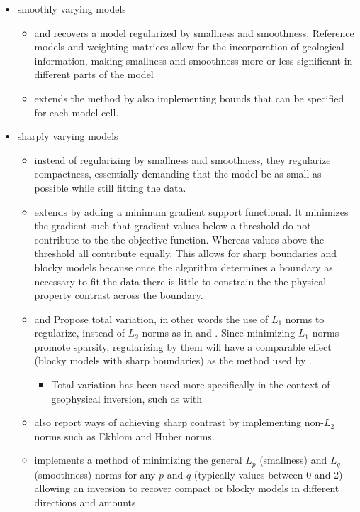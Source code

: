 \begin{itemize}
\item smoothly varying models
\begin{itemize}
\item \cite{li19963} and \cite{li19983}recovers a model regularized by smallness and smoothness. Reference models and weighting matrices allow for the incorporation of geological information, making smallness and smoothness more or less significant in different parts of the model

\item \cite{li2003fast}  extends the method by also implementing bounds that can be specified for each model cell.
\end{itemize}
\item sharply varying models	
\begin{itemize}	
\item \cite{last1983compact} instead of regularizing by smallness and smoothness, they regularize compactness, essentially demanding that the model be as small as possible while still fitting the data. 	
\item \cite{portniaguine1999focusing} extends  \cite{last1983compact} by adding a minimum gradient support functional. It minimizes the gradient such that gradient values below a threshold do not contribute to the the objective function. Whereas values above the threshold all contribute equally. This allows for sharp boundaries and blocky models because once the algorithm determines a boundary as necessary to fit the data there is little to constrain the the physical property contrast across the boundary.
\item \cite{rudin1992nonlinear} and \cite{vogel1998fast} Propose total variation, in other words the use of $L_1$ norms to regularize, instead of $L_2$ norms as in \cite{li19963} and \cite{li19983}. Since minimizing $L_1$ norms promote sparsity, regularizing by them will have a comparable effect (blocky models with sharp boundaries) as the method used by \cite{portniaguine1999focusing}.
	\begin{itemize}
		\item Total variation has been used more specifically in the context of geophysical inversion, such as with \cite{guitton2012blocky}		
	\end{itemize}
\item \cite{farquharson1998non} also report ways of achieving sharp contrast by implementing non-$L_2$ norms such as Ekblom and Huber norms.
\item \cite{fournier2015cooperative} implements a method of minimizing the general $L_p$ (smallness) and $L_q$ (smoothness) norms for any $p$ and $q$ (typically values between 0 and 2) allowing an inversion to recover compact or blocky models in different directions and amounts.

\end{itemize}
\end{itemize}
